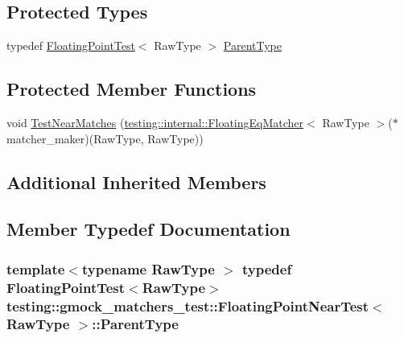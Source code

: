 \subsection*{Protected Types}
\begin{DoxyCompactItemize}
\item 
typedef \hyperlink{classtesting_1_1gmock__matchers__test_1_1FloatingPointTest}{Floating\+Point\+Test}$<$ Raw\+Type $>$ \hyperlink{classtesting_1_1gmock__matchers__test_1_1FloatingPointNearTest_ac767d2bf3e518d1e7cf9dfafc76cc53a}{Parent\+Type}
\end{DoxyCompactItemize}
\subsection*{Protected Member Functions}
\begin{DoxyCompactItemize}
\item 
void \hyperlink{classtesting_1_1gmock__matchers__test_1_1FloatingPointNearTest_a712b564197ab76f58d345c5e3e73955d}{Test\+Near\+Matches} (\hyperlink{classtesting_1_1internal_1_1FloatingEqMatcher}{testing\+::internal\+::\+Floating\+Eq\+Matcher}$<$ Raw\+Type $>$($\ast$matcher\+\_\+maker)(Raw\+Type, Raw\+Type))
\end{DoxyCompactItemize}
\subsection*{Additional Inherited Members}


\subsection{Member Typedef Documentation}
\subsubsection[{\texorpdfstring{Parent\+Type}{ParentType}}]{\setlength{\rightskip}{0pt plus 5cm}template$<$typename Raw\+Type $>$ typedef {\bf Floating\+Point\+Test}$<$Raw\+Type$>$ {\bf testing\+::gmock\+\_\+matchers\+\_\+test\+::\+Floating\+Point\+Near\+Test}$<$ Raw\+Type $>$\+::{\bf Parent\+Type}\hspace{0.3cm}{\ttfamily [protected]}}\hypertarget{classtesting_1_1gmock__matchers__test_1_1FloatingPointNearTest_ac767d2bf3e518d1e7cf9dfafc76cc53a}{}\label{classtesting_1_1gmock__matchers__test_1_1FloatingPointNearTest_ac767d2bf3e518d1e7cf9dfafc76cc53a}


